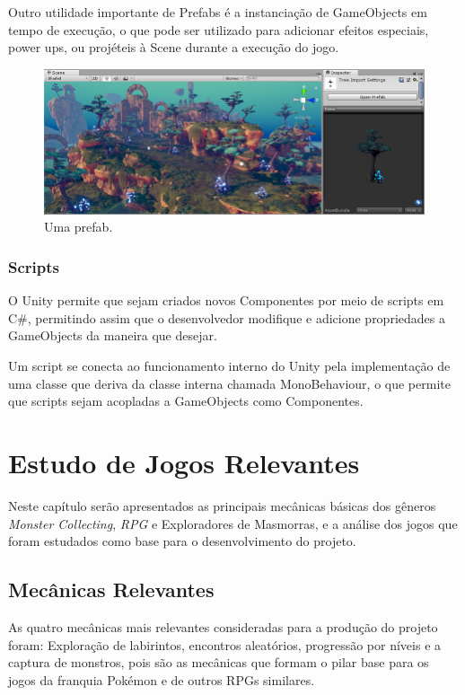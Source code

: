 \documentclass[
	12pt,				%
	openright,			%
	twoside,			%
	a4paper,			%
	english,			%
	french,				%
	spanish,			%
	brazil				%
	]{abntex2}
\begin{document}
	Outro utilidade importante de Prefabs é a instanciação de GameObjects em tempo de execução, o que pode ser utilizado para adicionar efeitos especiais, power ups, ou projéteis à Scene durante a execução do jogo.
\begin{figure}
  \includegraphics[width=\linewidth]{prefab.jpg}
  \caption{Uma prefab.}
  \label{fig:prefab}
\end{figure}	

\subsection{Scripts}

O Unity permite que sejam criados novos Componentes por meio de scripts em C\#, permitindo assim que o desenvolvedor modifique e adicione propriedades a GameObjects da maneira que desejar.

Um script se conecta ao funcionamento interno do Unity pela implementação de uma classe que deriva da classe interna chamada MonoBehaviour, o que permite que scripts sejam acopladas a GameObjects como Componentes.

\chapter{Estudo de Jogos Relevantes}

Neste capítulo serão apresentados as principais mecânicas básicas dos gêneros \emph{Monster Collecting}, \emph{RPG} e Exploradores de Masmorras, e a análise dos jogos que foram estudados como base para o desenvolvimento do projeto. 


\section{Mecânicas Relevantes}

As quatro mecânicas mais relevantes consideradas para a produção do projeto foram: Exploração de labirintos, encontros aleatórios, progressão por níveis e a captura de monstros, pois são as mecânicas que formam o pilar base para os jogos da franquia Pokémon e de outros RPGs similares.
\end{document}
